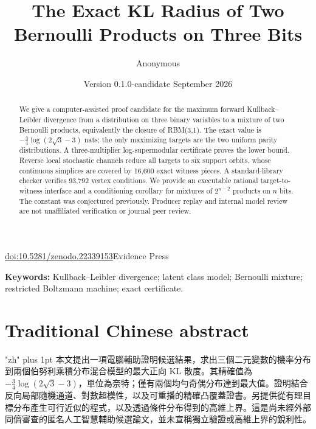 \documentclass[11pt,a4paper]{article}
\title{The Exact KL Radius of Two Bernoulli Products on Three Bits}
\author{Anonymous}
\date{Version 0.1.0-candidate\quad 5 September 2026}
\begin{document}
\maketitle
\begin{center}\small\href{https://doi.org/10.5281/zenodo.22339153}{doi:10.5281/zenodo.22339153}\quad\textbar\quad Evidence Press\end{center}
\begin{abstract}
We give a computer-assisted proof candidate for the maximum forward Kullback--Leibler divergence from a distribution on three binary variables to a mixture of two Bernoulli products, equivalently the closure of RBM(3,1). The exact value is $-\tfrac34\log(2\sqrt3-3)$ nats; the only maximizing targets are the two uniform parity distributions. A three-multiplier log-supermodular certificate proves the lower bound. Reverse local stochastic channels reduce all targets to six support orbits, whose continuous simplices are covered by 16,600 exact witness pieces. A standard-library checker verifies 93,792 vertex conditions. We provide an executable rational target-to-witness interface and a conditioning corollary for mixtures of $2^{n-2}$ products on $n$ bits. The constant was conjectured previously. Producer replay and internal model review are not unaffiliated verification or journal peer review.
\end{abstract}
\textbf{Keywords:} Kullback--Leibler divergence; latent class model; Bernoulli mixture; restricted Boltzmann machine; exact certificate.



\section*{Traditional Chinese abstract}
{\chinesefont\XeTeXlinebreaklocale "zh"\XeTeXlinebreakskip=0pt plus 1pt
本文提出一項電腦輔助證明候選結果，求出三個二元變數的機率分布到兩個伯努利乘積分布混合模型的最大正向 KL 散度。其精確值為 $-\tfrac34\log(2\sqrt3-3)$，單位為奈特；僅有兩個均勻奇偶分布達到最大值。證明結合反向局部隨機通道、對數超模性，以及可重播的精確凸覆蓋證書。另提供從有理目標分布產生可行近似的程式，以及透過條件分布得到的高維上界。這是尚未經外部同儕審查的匿名人工智慧輔助候選論文，並未宣稱獨立驗證或高維上界的銳利性。}
\end{document}
